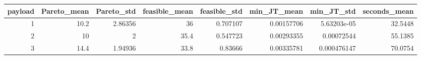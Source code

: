 \begin{tabular}{rrrrrrrr}
\toprule
payload & Pareto\_mean & Pareto\_std & feasible\_mean & feasible\_std & min\_JT\_mean & min\_JT\_std & seconds\_mean \\
\midrule
1 & 10.2 & 2.86356 & 36 & 0.707107 & 0.00157706 & 5.63203e-05 & 32.5448 \\
2 & 10 & 2 & 35.4 & 0.547723 & 0.00293355 & 0.00072544 & 55.1385 \\
3 & 14.4 & 1.94936 & 33.8 & 0.83666 & 0.00335781 & 0.000476147 & 70.0754 \\
\bottomrule
\end{tabular}
